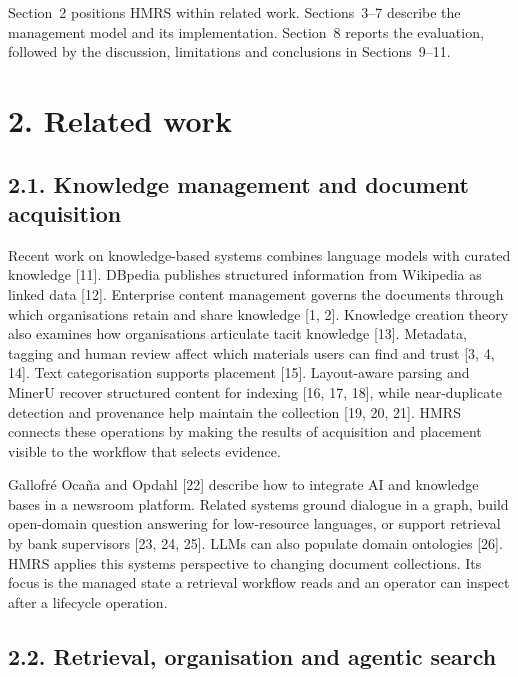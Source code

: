 Section~2 positions HMRS within related work.
Sections~3--7 describe the management
model and its implementation. Section~8 reports the evaluation,
followed by the discussion, limitations and conclusions in
Sections~9--11.


\section{2. Related work}


\subsection{2.1. Knowledge management and document acquisition}

Recent work on knowledge-based systems combines language models with curated
knowledge [11]. DBpedia publishes structured
information from Wikipedia as linked data [12].
Enterprise content management governs the documents through which
organisations retain and share knowledge
[1, 2]. Knowledge creation theory
also examines how organisations articulate tacit knowledge
[13].
Metadata, tagging and human review affect which materials users can find and
trust [3, 4, 14].
Text categorisation supports placement [15].
Layout-aware parsing and MinerU recover structured content for indexing
[16, 17, 18], while
near-duplicate detection and provenance help maintain the collection
[19, 20, 21].
HMRS connects these operations by making the results of acquisition and
placement visible to the workflow that selects evidence.

Gallofr\'e Oca\~na and Opdahl [22] describe how to
integrate AI and knowledge bases in a newsroom platform. Related systems
ground dialogue in a graph, build open-domain question answering for
low-resource languages, or support retrieval by bank supervisors
[23, 24, 25]. LLMs can also
populate domain ontologies [26]. HMRS applies this systems
perspective to changing document collections. Its focus is the managed
state a retrieval workflow reads and an operator can inspect after a
lifecycle operation.

\subsection{2.2. Retrieval, organisation and agentic search}


